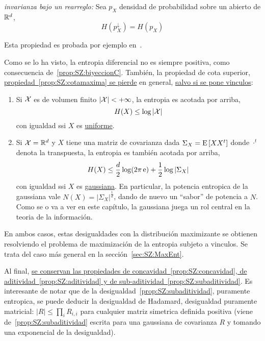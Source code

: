 \begin{propiedadesC}\setcounter{enumi}{\value{PropPermutacion}}
\item\label{prop:SZ:permutacionC} {\it invarianza  bajo un rearreglo:} Sea $p_X$
  densidad   de  probabilidad   sobre   un  abierto   de  $\mathbb{R}^d$,
  \[
  H\left( p_X^\downarrow \right) = H(p_X)
  \]
\end{propiedadesC}
%
\noindent Esta propiedad es probada por ejemplo en~\cite{LieLos01, WanMad04}.


Como  se lo  ha visto,  la  entropia diferencial  no es  siempre positiva,  como
consecuencia  de~\ref{prop:SZ:biyeccionC}.   Tambi\'en,  la  propiedad  de  cota
superior,  \underline{propiedad~\ref{prop:SZ:cotamaxima} se pierde}  en general,
\underline{salvo si se pone vinculos}:
%
\begin{propiedadesC}\setcounter{enumi}{\value{PropCotamaxima}}
\item
  \begin{enumerate}
  \item\label{prop:SZ:cotamaximauniforme} Si $\mathcal{X}$ es de volumen finito $|\mathcal{X}| < +
    \infty$, la entropia es acotada por arriba,
    \[
    H(X) \le \log |\mathcal{X}|
    \]
    con igualdad ssi $X$ es \underline{uniforme}.
  \item\label{prop:SZ:cotamaximagaussiana}  Si  $\mathcal{X} =\mathbb{R}^d$  y  $X$ tiene  una
    matriz  de covarianza  dada  $\Sigma_X  = \operatorname{E}\left[  X  X^t \right]$  donde
    $\cdot^t$  denota  la transpuesta,  la  entropia  es  tambi\'en acotada  por
    arriba,
    \[
    H(X) \le \frac{d}{2} \log(2 \pi \operatorname{e}) + \frac12 \log |\Sigma_X|
    \]
    con igualdad  ssi $X$ es \underline{gaussiana}.  En  particular, la potencia
    entropica de  la gaussiana vale $N(X) =  \left| \Sigma_X \right|^{\frac1d}$,
    dando de nuevo un  ``sabor'' de potencia a $N$.  Como se o  va a ver en este
    cap\'itulo,  la  gaussiana  juega  un   rol  central  en  la  teoria  de  la
    informaci\'on.
  \end{enumerate}
  En  ambos casos,  estas  desigualdades con  la  distribuci\'on maximizante  se
  obtienen resolviendo  el problema de  maximizaci\'on de la entropia  subjeto a
  vinculos.      Se     trata    del     caso     m\'as     general    en     la
  secci\'on~\ref{sec:SZ:MaxEnt}.
\end{propiedadesC}

Al      final,     \underline{se      conservan      las     propiedades      de
  concavidad~\ref{prop:SZ:concavidad},  de aditividad~\ref{prop:SZ:aditividad} y
  de sub-aditividad~\ref{prop:SZ:subaditividad}}.   Es interesante de  notar que
de  la desigualdad~\ref{prop:SZ:subaditividad},  puramente  entropica, se  puede
deducir la  desigualdad de Hadamard,  desigualdad puramente matricial:  $|R| \le
\prod_i  R_{i,i}$  para  cualquier  matriz simetrica  definida  positiva  (viene
de~\ref{prop:SZ:subaditividad} escrita  para una  gaussiana de covarianza  $R$ y
tomando una exponencial de la desigualdad).


